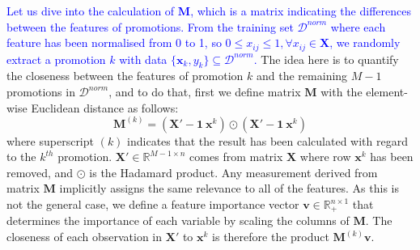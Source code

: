 \documentclass{ieeeaccess}
\newcommand{\myblue}[1]{\textcolor{blue}{#1}}
\begin{document}
\myblue{Let us dive into the calculation of $\mathbf{M}$, which is a matrix indicating the differences between the features of promotions. From the training set $\mathcal{D}^{norm}$  where each feature has been normalised from 0 to 1, so $ 0 \leq x_{ij} \leq 1,  \forall x_{ij} \in \mathbf{X}$, we randomly extract a promotion $k$ with data $\{\mathbf{x}_k, y_k \} \subseteq \mathcal{D}^{norm}$.} The idea here is to quantify the closeness between the features of promotion $k$ and the remaining $M-1$ promotions in $\mathcal{D}^{norm}$, and to do that, first we define matrix $\mathbf{M}$ with the element-wise Euclidean distance as follows:
\begin{equation} 
\mathbf{M}^{(k)} = (\mathbf{X'}-\mathbf{1}~\mathbf{x}^k) \odot (\mathbf{X'}-\mathbf{1}~\mathbf{x}^k)
\label{eqn:featuresMatrix}
\end{equation}
% 
% 
where superscript $(k)$ indicates that the result has been calculated with regard to the $k^{th}$ promotion. $\mathbf{X'} \in \mathbb{R}^{M-1 \times n}$ comes from matrix $\mathbf{X}$ where row $\mathbf{x}^k$ has been removed, and $\odot$ is the Hadamard product. Any measurement derived from matrix $\mathbf{M}$ implicitly assigns the same relevance to all of the features. As this is not the general case, we define a feature importance vector $\mathbf{v} \in \mathbb{R}_{+}^{n \times 1}$ that determines the importance of each variable by scaling the columns of $\mathbf{M}$. The closeness of each observation in $\mathbf{X'}$ to $\mathbf{x}^k$ is therefore the product $\mathbf{M}^{(k)} \mathbf{v}$. 
\end{document}
